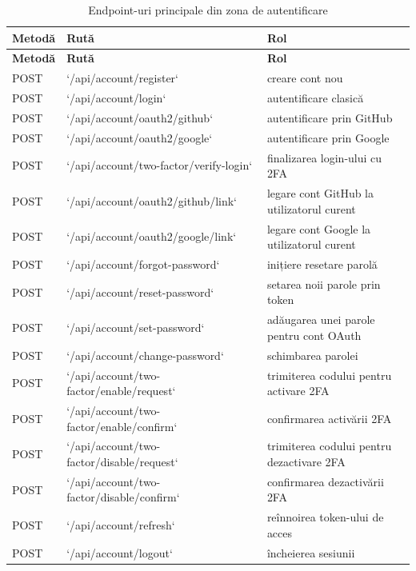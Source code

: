 \begin{longtable}{>{\RaggedRight\arraybackslash}p{2cm}>{\RaggedRight\arraybackslash}p{5.7cm}>{\RaggedRight\arraybackslash}p{6.2cm}}
  \caption{Endpoint-uri principale din zona de autentificare} \\
  \toprule
  \textbf{Metodă} & \textbf{Rută} & \textbf{Rol} \\
  \midrule
  \endfirsthead
  \toprule
  \textbf{Metodă} & \textbf{Rută} & \textbf{Rol} \\
  \midrule
  \endhead
  POST & `/api/account/register` & creare cont nou \\
  POST & `/api/account/login` & autentificare clasică \\
  POST & `/api/account/oauth2/github` & autentificare prin GitHub \\
  POST & `/api/account/oauth2/google` & autentificare prin Google \\
  POST & `/api/account/two-factor/verify-login` & finalizarea login-ului cu 2FA \\
  POST & `/api/account/oauth2/github/link` & legare cont GitHub la utilizatorul curent \\
  POST & `/api/account/oauth2/google/link` & legare cont Google la utilizatorul curent \\
  POST & `/api/account/forgot-password` & inițiere resetare parolă \\
  POST & `/api/account/reset-password` & setarea noii parole prin token \\
  POST & `/api/account/set-password` & adăugarea unei parole pentru cont OAuth \\
  POST & `/api/account/change-password` & schimbarea parolei \\
  POST & `/api/account/two-factor/enable/request` & trimiterea codului pentru activare 2FA \\
  POST & `/api/account/two-factor/enable/confirm` & confirmarea activării 2FA \\
  POST & `/api/account/two-factor/disable/request` & trimiterea codului pentru dezactivare 2FA \\
  POST & `/api/account/two-factor/disable/confirm` & confirmarea dezactivării 2FA \\
  POST & `/api/account/refresh` & reînnoirea token-ului de acces \\
  POST & `/api/account/logout` & încheierea sesiunii \\
  \bottomrule
\end{longtable}

